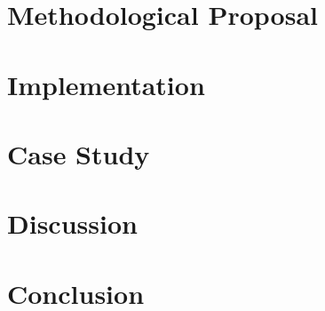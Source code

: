 \documentclass[10pt, a4paper, twocolumn]{article} %
\begin{document}
\section{Methodological Proposal}


\section{Implementation}


\section{Case Study}


\section{Discussion}


\section{Conclusion}


\clearpage
\printbibliography[title={Bibliography}] %


\end{document}
